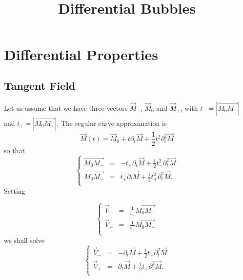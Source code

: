 \documentclass[aps]{revtex4}
\newcommand{\myvec}[1]{\overrightarrow{#1}}
\begin{document}
\title{Differential Bubbles}
\maketitle

\section{Differential Properties}

\subsection{Tangent Field}
Let us assume that we have three vectors $\vec{M}_-$, $\vec{M}_0$ and $\vec{M}_+$, with
$t_-=\left\vert \myvec{M_0M_-}\right\vert$ and $t_+=\left\vert \myvec{M_0M_+}\right\vert$.
The regular curve approximation is
\begin{equation}
	\vec{M}(t) = \vec{M}_0 + t \partial_t \vec{M} + \frac{1}{2} t^2 \partial_{t}^2 \vec{M}
\end{equation}
so that
\begin{equation}
\left\lbrace
\begin{array}{rcl}
	\myvec{M_0M_-} & = & -t_- \partial_t \vec{M} + \frac{1}{2} t_-^2 \partial_{t}^2 \vec{M}\\
	\myvec{M_0M_-} & = &  t_+ \partial_t \vec{M} + \frac{1}{2} t_+^2 \partial_{t}^2 \vec{M}.\\
\end{array}
\right.
\end{equation}
Setting

\begin{equation}
\left\lbrace
\begin{array}{rcl}
	\vec{V}_- & = & \frac{1}{t_-} \myvec{M_0M_-}\\
	\vec{V}_+ & = & \frac{1}{t_+} \myvec{M_0M_+}\\
\end{array}
\right.
\end{equation}
we shall solve
\begin{equation}
	\left\lbrace
	\begin{array}{rcl}
	\vec{V}_- & = & -\partial_t \vec{M} + \frac{1}{2} t_- \partial_{t}^2 \vec{M}\\
	\vec{V}_+ & = & \partial_t \vec{M} + \frac{1}{2} t_+ \partial_{t}^2 \vec{M}.\\
	\end{array}
\right.
\end{equation}
\end{document}
